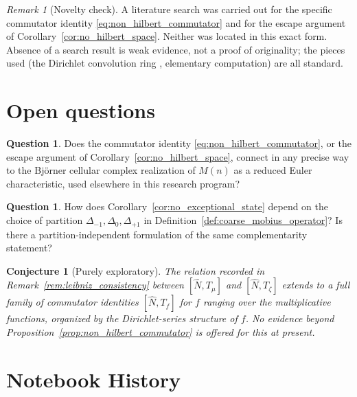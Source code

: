 \documentclass[11pt]{amsart}
\numberwithin{equation}{section}
\theoremstyle{plain}
\newtheorem{conjecture}[theorem]{Conjecture}
\theoremstyle{definition}
\newtheorem{question}[theorem]{Question}
\theoremstyle{remark}
\newtheorem{remark}[theorem]{Remark}
\begin{document}
\begin{remark}[Novelty check]
\label{rem:novelty_check}
A literature search was carried out for the specific commutator
identity \eqref{eq:non_hilbert_commutator} and for the escape argument
of Corollary~\ref{cor:no_hilbert_space}. Neither was located in this
exact form. Absence of a search result is weak evidence, not a proof
of originality; the pieces used (the Dirichlet convolution ring
\cite{CashwellEverett1959}, elementary computation) are all standard.
\end{remark}

\section{Open questions}
\label{sec:open}

\begin{question}
\label{q:relate_to_bjorner}
Does the commutator identity \eqref{eq:non_hilbert_commutator}, or the
escape argument of Corollary~\ref{cor:no_hilbert_space}, connect in any
precise way to the Bj\"orner cellular complex realization of $M(n)$ as
a reduced Euler characteristic, used elsewhere in this research
program?
\end{question}

\begin{question}
\label{q:other_partitions}
How does Corollary~\ref{cor:no_exceptional_state} depend on the choice
of partition $\Delta_{-1},\Delta_0,\Delta_{+1}$ in
Definition~\ref{def:coarse_mobius_operator}? Is there a
partition-independent formulation of the same complementarity
statement?
\end{question}

\begin{conjecture}[Purely exploratory]
\label{conj:leibniz_extension}
The relation recorded in Remark~\ref{rem:leibniz_consistency} between
$[\hat N,T_\mu]$ and $[\hat N,T_\zeta]$ extends to a full family of
commutator identities $[\hat N,T_f]$ for $f$ ranging over the
multiplicative functions, organized by the Dirichlet-series structure
of $f$. No evidence beyond Proposition~\ref{prop:non_hilbert_commutator}
is offered for this at present.
\end{conjecture}

\section*{Notebook History}
\end{document}
